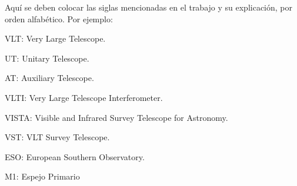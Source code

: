 
Aquí se deben colocar las siglas mencionadas en el trabajo y su explicación, por orden alfabético. Por ejemplo: \\

{\setlength{\parskip}{0cm} %
VLT: Very Large Telescope.

UT: Unitary Telescope.

AT: Auxiliary Telescope.

VLTI: Very Large Telescope Interferometer.

VISTA: Visible and Infrared Survey Telescope for Astronomy.

VST: VLT Survey Telescope.

ESO: European Southern Observatory.

M1: Espejo Primario
}
